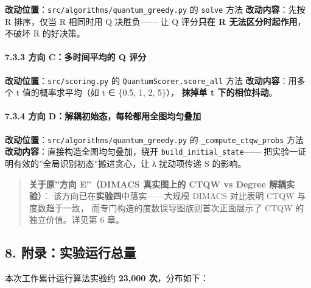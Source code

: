 \documentclass[
  11pt,
]{ctexart}
\begin{document}
\textbf{改动位置}：\texttt{src/algorithms/quantum\_greedy.py} 的
\texttt{solve} 方法 \textbf{改动内容}：先按 R 排序，仅当 R 相同时用 Q
决胜负------ 让 Q 评分\textbf{只在 R 无法区分时起作用}，不破坏 R
的好决策。

\paragraph{7.3.3 方向 C：多时间平均的 Q
评分}\label{ux65b9ux5411-cux591aux65f6ux95f4ux5e73ux5747ux7684-q-ux8bc4ux5206}

\textbf{改动位置}：\texttt{src/scoring.py} 的
\texttt{QuantumScorer.score\_all} 方法 \textbf{改动内容}：用多个 t
值的概率求平均（如 t ∈ \{0.5, 1, 2, 5\}）， \textbf{抹掉单 t
下的相位抖动}。

\paragraph{7.3.4 方向
D：解耦初始态，每轮都用全图均匀叠加}\label{ux65b9ux5411-dux89e3ux8026ux521dux59cbux6001ux6bcfux8f6eux90fdux7528ux5168ux56feux5747ux5300ux53e0ux52a0}

\textbf{改动位置}：\texttt{src/algorithms/quantum\_greedy.py} 的
\texttt{\_compute\_ctqw\_probs} 方法
\textbf{改动内容}：直接构造全图均匀叠加，绕开
\texttt{build\_initial\_state}------
把实验一证明有效的''全局识别初态''搬进贪心，让 λ 扰动项传递 S 的影响。

\begin{quote}
\textbf{关于原''方向 E''（DIMACS 真实图上的 CTQW vs Degree 解耦实验）}：
该方向已在\textbf{实验四}中落实------大规模 DIMACS 对比表明 CTQW
与度数趋于一致， 而专门构造的度数误导图族则首次正面展示了 CTQW
的独立价值。详见第 6 章。
\end{quote}

\subsection{8.
附录：实验运行总量}\label{ux9644ux5f55ux5b9eux9a8cux8fd0ux884cux603bux91cf}

本次工作累计运行算法实验约 \textbf{23,000 次}，分布如下：
\end{document}
